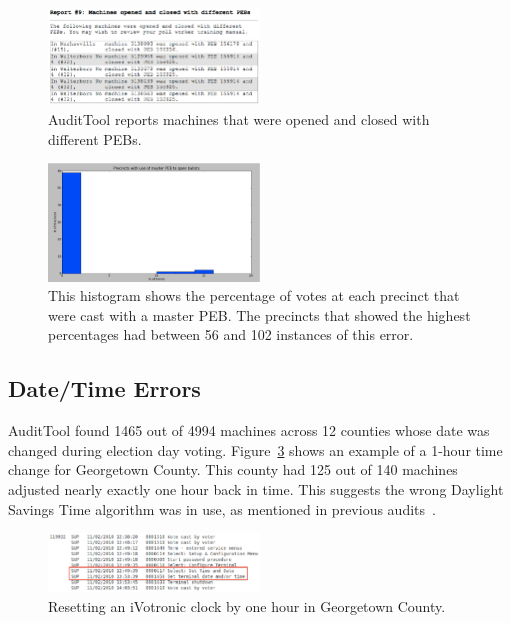 \documentclass[letterpaper,twocolumn,10pt]{article}
\begin{document}
\begin{figure}[htbp]
\begin{center}
    \includegraphics[width=0.5\textwidth,height=0.2\textheight]{OpenClosePEBs.eps}
\end{center}
\caption{AuditTool reports machines that were opened and closed with different PEBs.}
\label{fig:diff-pebs-open-close}
\end{figure}

\begin{figure}[htbp]
\begin{center}
    \includegraphics[width=0.5\textwidth,height=0.4\textheight]{PEBactivateHist.eps}
\end{center}
\caption{This histogram shows the percentage of votes at each precinct that were 
cast with a master PEB.  The precincts that showed the highest percentages had 
between 56 and 102 instances of this error.}
\label{fig:master-peb-activated}
\end{figure}

\subsection{Date/Time Errors}
 AuditTool found 1465 out of 4994 machines across 12 counties whose date was
 changed during election day voting. Figure~\ref{fig:one-hour-reset} shows an
 example of a 1-hour time change for Georgetown County. This county had 125 out
 of 140 machines adjusted nearly exactly one hour back in time. This suggests
 the wrong Daylight Savings Time algorithm was in use, as mentioned in previous
 audits~\cite{Buell2011}.

\begin{figure}[htbp]
\begin{center}
    \includegraphics[width=0.5\textwidth,height=0.1\textheight]{ResetClock.eps}
\end{center}
\caption{Resetting an iVotronic clock by one hour in Georgetown County.}
\label{fig:one-hour-reset}
\end{figure}
\end{document}
